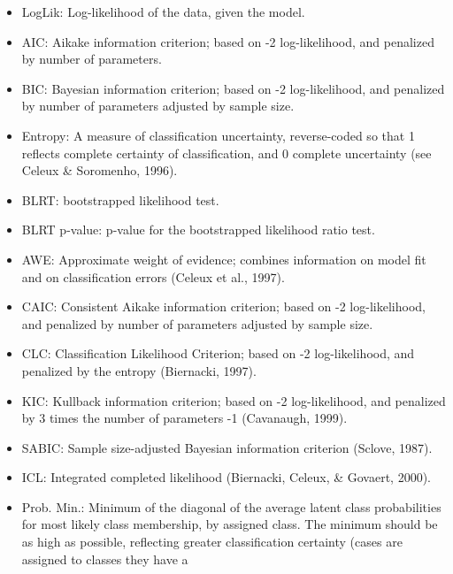 \documentclass[]{article}
\begin{document}
\begin{itemize}
\item
  LogLik: Log-likelihood of the data, given the model.\\
\item
  AIC: Aikake information criterion; based on -2 log-likelihood, and
  penalized by number of parameters.\\
\item
  BIC: Bayesian information criterion; based on -2 log-likelihood, and
  penalized by number of parameters adjusted by sample size.\\
\item
  Entropy: A measure of classification uncertainty, reverse-coded so
  that 1 reflects complete certainty of classification, and 0 complete
  uncertainty (see Celeux \& Soromenho, 1996).\\
\item
  BLRT: bootstrapped likelihood test.\\
\item
  BLRT p-value: p-value for the bootstrapped likelihood ratio test.
\item
  AWE: Approximate weight of evidence; combines information on model fit
  and on classification errors (Celeux et al., 1997).\\
\item
  CAIC: Consistent Aikake information criterion; based on -2
  log-likelihood, and penalized by number of parameters adjusted by
  sample size.\\
\item
  CLC: Classification Likelihood Criterion; based on -2 log-likelihood,
  and penalized by the entropy (Biernacki, 1997).\\
\item
  KIC: Kullback information criterion; based on -2 log-likelihood, and
  penalized by 3 times the number of parameters -1 (Cavanaugh, 1999).\\
\item
  SABIC: Sample size-adjusted Bayesian information criterion (Sclove,
  1987).\\
\item
  ICL: Integrated completed likelihood (Biernacki, Celeux, \& Govaert,
  2000).\\
\item
  Prob. Min.: Minimum of the diagonal of the average latent class
  probabilities for most likely class membership, by assigned class. The
  minimum should be as high as possible, reflecting greater
  classification certainty (cases are assigned to classes they have a

\end{itemize}
\end{document}
